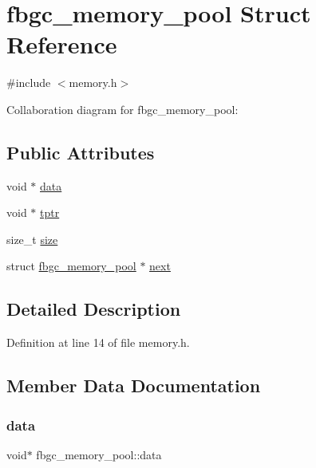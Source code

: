 \hypertarget{structfbgc__memory__pool}{}\section{fbgc\+\_\+memory\+\_\+pool Struct Reference}
\label{structfbgc__memory__pool}


{\ttfamily \#include $<$memory.\+h$>$}



Collaboration diagram for fbgc\+\_\+memory\+\_\+pool\+:
\subsection*{Public Attributes}
\begin{DoxyCompactItemize}
\item 
void $\ast$ \hyperlink{structfbgc__memory__pool_a090e06aafc9cdc78140b19391f6ee3a3}{data}
\item 
void $\ast$ \hyperlink{structfbgc__memory__pool_acef6b14cab29711ac7d0736c9e33662b}{tptr}
\item 
size\+\_\+t \hyperlink{structfbgc__memory__pool_a9ed0b42e3a4c3c2022e21f7e84b5afc0}{size}
\item 
struct \hyperlink{structfbgc__memory__pool}{fbgc\+\_\+memory\+\_\+pool} $\ast$ \hyperlink{structfbgc__memory__pool_a6ffafbe2e1fd8d773d8e2130cdf7a36c}{next}
\end{DoxyCompactItemize}


\subsection{Detailed Description}


Definition at line 14 of file memory.\+h.



\subsection{Member Data Documentation}
\mbox{\label{structfbgc__memory__pool_a090e06aafc9cdc78140b19391f6ee3a3}} 
\subsubsection{\texorpdfstring{data}{data}}
{\footnotesize\ttfamily void$\ast$ fbgc\+\_\+memory\+\_\+pool\+::data}



